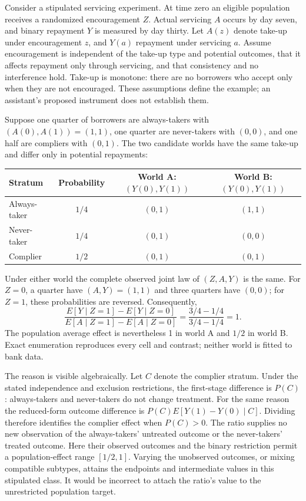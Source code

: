 Consider a stipulated servicing experiment. At time zero an eligible population
receives a randomized encouragement $Z$. Actual servicing $A$ occurs by day
seven, and binary repayment $Y$ is measured by day thirty. Let $A(z)$ denote
take-up under encouragement $z$, and $Y(a)$ repayment under servicing $a$.
Assume encouragement is independent of the take-up type and potential outcomes,
that it affects repayment only through servicing, and that consistency and no
interference hold. Take-up is monotone: there are no borrowers who accept only
when they are not encouraged. These assumptions define the example; an
assistant's proposed instrument does not establish them. \citep{exec14_ident_exact}

Suppose one quarter of borrowers are always-takers with $(A(0),A(1))=(1,1)$,
one quarter are never-takers with $(0,0)$, and one half are compliers with
$(0,1)$. The two candidate worlds have the same take-up and differ only in
potential repayments:
\begin{center}
\begin{tabular}{lccc}
\hline
Stratum & Probability & World A: $(Y(0),Y(1))$ & World B: $(Y(0),Y(1))$ \\
\hline
Always-taker & $1/4$ & $(0,1)$ & $(1,1)$ \\
Never-taker & $1/4$ & $(0,1)$ & $(0,0)$ \\
Complier & $1/2$ & $(0,1)$ & $(0,1)$ \\
\hline
\end{tabular}
\end{center}
Under either world the complete observed joint law of $(Z,A,Y)$ is the same.
For $Z=0$, a quarter have $(A,Y)=(1,1)$ and three quarters have $(0,0)$;
for $Z=1$, these probabilities are reversed. Consequently,
\[
 \frac{E[Y\mid Z=1]-E[Y\mid Z=0]}{E[A\mid Z=1]-E[A\mid Z=0]}
 =\frac{3/4-1/4}{3/4-1/4}=1.
\]
The population average effect is nevertheless 1 in world A and $1/2$ in world B.
Exact enumeration reproduces every cell and contrast; neither world is fitted
to bank data. \citep{exec14_ident_exact}

The reason is visible algebraically. Let $C$ denote the complier stratum.
Under the stated independence and exclusion restrictions, the first-stage
difference is $P(C)$: always-takers and never-takers do not change treatment.
For the same reason the reduced-form outcome difference is
$P(C)E[Y(1)-Y(0)\mid C]$. Dividing therefore identifies the complier effect
when $P(C)>0$. The ratio supplies no new observation of the always-takers'
untreated outcome or the never-takers' treated outcome. Here their observed
outcomes and the binary restriction permit a population-effect range
$[1/2,1]$. Varying the unobserved outcomes, or mixing compatible subtypes,
attains the endpoints and intermediate values in this stipulated class.
It would be incorrect to attach the ratio's value to the unrestricted
population target. \citep{exec14_ident_exact}

